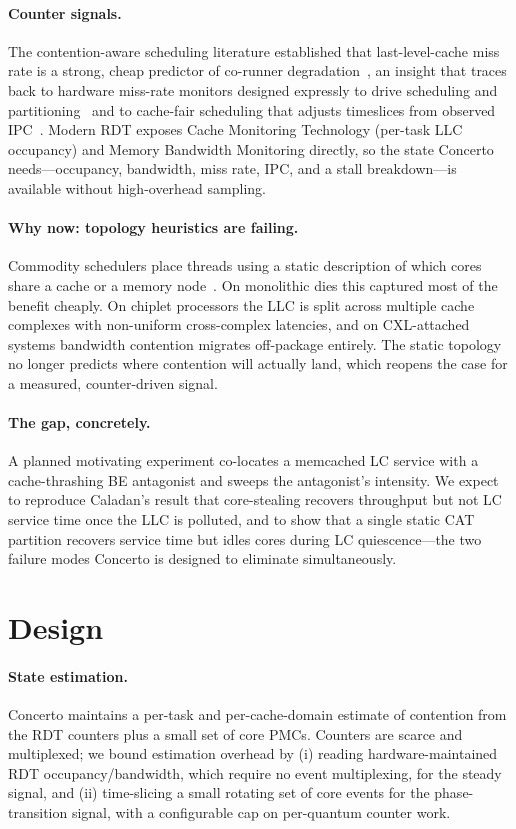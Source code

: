 \documentclass[sigconf,nonacm]{acmart}
\begin{document}
\paragraph{Counter signals.}
The contention-aware scheduling literature established that last-level-cache
miss rate is a strong, cheap predictor of co-runner
degradation~\cite{zhuravlev2010contention,blagodurov2010contentionaware}, an
insight that traces back to hardware miss-rate monitors designed expressly to
drive scheduling and partitioning~\cite{suh2002memory} and to cache-fair
scheduling that adjusts timeslices from observed IPC~\cite{fedorova2007isolation}.
Modern RDT exposes Cache Monitoring Technology (per-task LLC occupancy) and
Memory Bandwidth Monitoring directly, so the state Concerto needs---occupancy,
bandwidth, miss rate, IPC, and a stall breakdown---is available without
high-overhead sampling.

\paragraph{Why now: topology heuristics are failing.}
Commodity schedulers place threads using a static description of which cores
share a cache or a memory node~\cite{tam2007clustering}. On monolithic dies this
captured most of the benefit cheaply. On chiplet processors the LLC is split
across multiple cache complexes with non-uniform cross-complex latencies, and on
CXL-attached systems bandwidth contention migrates off-package entirely. The
static topology no longer predicts where contention will actually land, which
reopens the case for a measured, counter-driven signal.

\paragraph{The gap, concretely.}
A planned motivating experiment co-locates a memcached LC service with a
cache-thrashing BE antagonist and sweeps the antagonist's intensity. We expect to
reproduce Caladan's result that core-stealing recovers throughput but not LC
service time once the LLC is polluted, and to show that a single static CAT
partition recovers service time but idles cores during LC quiescence---the two
failure modes Concerto is designed to eliminate simultaneously.

\section{Design}
\paragraph{State estimation.}
Concerto maintains a per-task and per-cache-domain estimate of contention from
the RDT counters plus a small set of core PMCs. Counters are scarce and
multiplexed; we bound estimation overhead by (i) reading hardware-maintained RDT
occupancy/bandwidth, which require no event multiplexing, for the steady signal,
and (ii) time-slicing a small rotating set of core events for the
phase-transition signal, with a configurable cap on per-quantum counter work.
\end{document}
